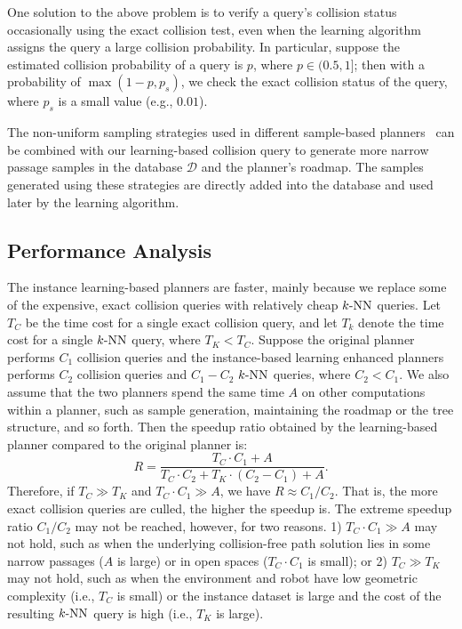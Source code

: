 One solution to the above problem is to verify a query's collision status occasionally using the exact collision test, even when the learning algorithm assigns the query a large collision probability. In particular, suppose the estimated collision probability of a query is $p$, where $p \in (0.5, 1]$; then with a probability of $\max(1 - p, p_s)$, we check the exact collision status of the query, where $p_s$ is a small value (e.g., $0.01$).

The non-uniform sampling strategies used in different sample-based planners~\cite{Boor:1999:ICRA,Rodriguez:2006,Zheng:2005} can be combined with our learning-based collision query to generate more narrow passage samples in the database $\mathcal D$ and the planner's roadmap. The samples generated using these strategies are directly added into the database and used later by the learning algorithm.


\subsection{Performance Analysis}

The instance learning-based planners are faster, mainly because we replace some of the expensive, exact collision queries with relatively cheap $k\text{-NN}$ queries. Let $T_C$ be the time cost for a single exact collision query, and let $T_k$ denote the time cost for a single $k\text{-NN}$ query, where $T_K < T_C$. Suppose the original planner performs $C_1$ collision queries and the instance-based learning enhanced planners performs $C_2$ collision queries and $C_1 - C_2$ $k\text{-NN}$ queries, where $C_2 < C_1$. We also assume that the two planners spend the same time $A$ on other computations within a planner, such as sample generation, maintaining the roadmap or the tree structure, and so forth. Then the speedup ratio obtained by the learning-based planner compared to the original planner is:
\begin{equation}
  R = \frac{T_C \cdot C_1 + A}{T_C \cdot C_2 + T_K \cdot (C_2 - C_1) + A}.
\end{equation}
Therefore, if $T_C \gg T_K$ and $T_C \cdot C_1 \gg A$, we have $R \approx C_1 / C_2$. That is, the more exact collision queries are culled, the higher the speedup is. The extreme speedup ratio $C_1 / C_2$ may not be reached, however, for two reasons. 1) $T_C \cdot C_1 \gg A$ may not hold, such as when the underlying collision-free path solution lies in some narrow passages ($A$ is large) or in open spaces ($T_C \cdot C_1$ is small); or 2) $T_C \gg T_K$ may not hold, such as when the environment and robot have low geometric complexity (i.e., $T_C$ is small) or the instance dataset is large and the cost of the resulting $k\text{-NN}$ query is high (i.e., $T_K$ is large).

